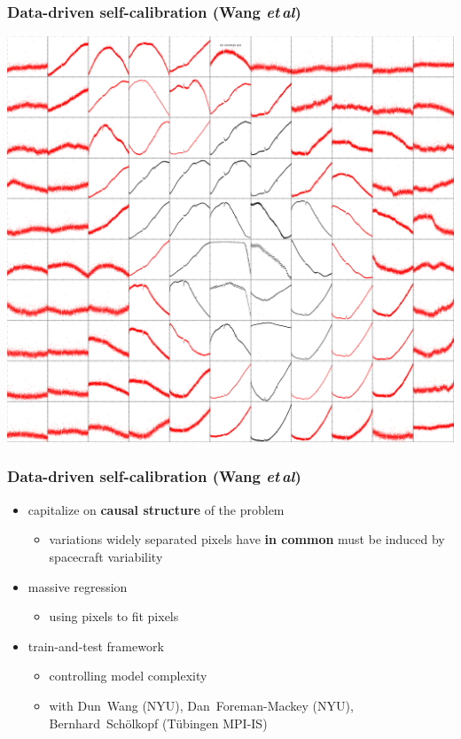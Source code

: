 \documentclass{beamer}
\newcommand{\foreign}[1]{\textsl{#1}}
\newcommand{\etal}{\foreign{et\,al}}
\renewcommand{\emph}[1]{\textbf{#1}}
\begin{document}
\begin{frame}
  \frametitle{Data-driven self-calibration \small{(Wang \etal)}}
  \includegraphics[height=0.85\textheight]{kic_03544595_05_pixels.png}
\end{frame}

\begin{frame}
  \frametitle{Data-driven self-calibration \small{(Wang \etal)}}
  \begin{itemize}
  \item capitalize on \emph{causal structure} of the problem
    \begin{itemize}
    \item variations widely separated pixels have \emph{in common} must be induced by spacecraft variability
    \end{itemize}
  \item massive regression
    \begin{itemize}
    \item using pixels to fit pixels
    \end{itemize}
  \item train-and-test framework
    \begin{itemize}
    \item controlling model complexity
    \item with Dun~Wang (NYU), Dan~Foreman-Mackey (NYU), Bernhard~Sch\"olkopf (T\"ubingen MPI-IS)
    \end{itemize}
  \end{itemize}
\end{frame}
\end{document}
